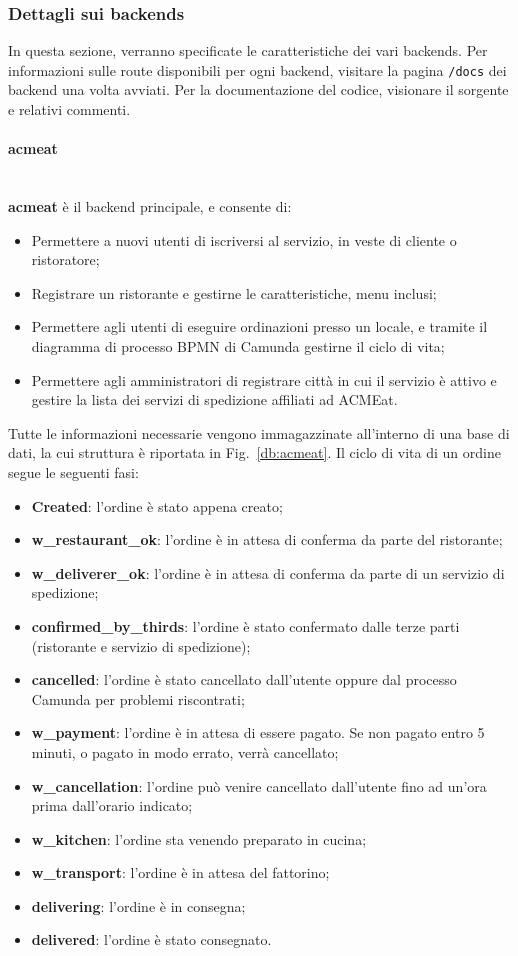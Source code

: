 \documentclass[11pt]{article} %
\begin{document}
\subsubsection{Dettagli sui backends}

In questa sezione, verranno specificate le caratteristiche dei vari backends. Per informazioni sulle route disponibili per ogni backend, visitare la pagina \verb|/docs| dei backend una volta avviati. Per la documentazione del codice, visionare il sorgente e relativi commenti.

\paragraph{acmeat}\mbox{}\\
\textbf{acmeat} è il backend principale, e consente di:
\begin{itemize}
\item Permettere a nuovi utenti di iscriversi al servizio, in veste di cliente o ristoratore;
\item Registrare un ristorante e gestirne le caratteristiche, menu inclusi;
\item Permettere agli utenti di eseguire ordinazioni presso un locale, e tramite il diagramma di processo BPMN di Camunda gestirne il ciclo di vita;
\item Permettere agli amministratori di registrare città in cui il servizio è attivo e gestire la lista dei servizi di spedizione affiliati ad ACMEat.
\end{itemize}
Tutte le informazioni necessarie vengono immagazzinate all'interno di una base di dati, la cui struttura è riportata in Fig.~\ref{db:acmeat}. Il ciclo di vita di un ordine segue le seguenti fasi:
\begin{itemize}
\item \textbf{Created}: l'ordine è stato appena creato;
\item \textbf{w\_restaurant\_ok}: l'ordine è in attesa di conferma da parte del ristorante;
\item \textbf{w\_deliverer\_ok}: l'ordine è in attesa di conferma da parte di un servizio di spedizione;
\item \textbf{confirmed\_by\_thirds}: l'ordine è stato confermato dalle terze parti (ristorante e servizio di spedizione);
\item \textbf{cancelled}: l'ordine è stato cancellato dall'utente oppure dal processo Camunda per problemi riscontrati;
\item \textbf{w\_payment}: l'ordine è in attesa di essere pagato. Se non pagato entro 5 minuti, o pagato in modo errato, verrà cancellato;
\item \textbf{w\_cancellation}: l'ordine può venire cancellato dall'utente fino ad un'ora prima dall'orario indicato;
\item \textbf{w\_kitchen}: l'ordine sta venendo preparato in cucina;
\item \textbf{w\_transport}: l'ordine è in attesa del fattorino;
\item \textbf{delivering}: l'ordine è in consegna;
\item \textbf{delivered}: l'ordine è stato consegnato.
\end{itemize}
\end{document}
